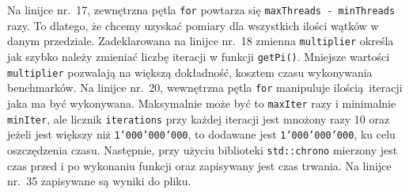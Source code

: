Na linijce nr.~17, zewnętrzna pętla \texttt{for} powtarza się \texttt{maxThreads - minThreads} razy. To dlatego, że chcemy uzyskać pomiary dla wszystkich ilości wątków w danym przedziale. Zadeklarowana na linijce nr.~18 zmienna \texttt{multiplier} określa jak szybko należy zmieniać liczbę iteracji w funkcji \texttt{getPi()}. Mniejsze wartości \texttt{multiplier} pozwalają na większą dokładność, kosztem czasu wykonywania benchmarków. Na linijce nr.~20, wewnętrzna pętla \texttt{for} manipuluje ilością iteracji jaka ma być wykonywana. Maksymalnie może być to \texttt{maxIter} razy i minimalnie \texttt{minIter}, ale licznik \texttt{iterations} przy każdej iteracji jest mnożony razy 10 oraz jeżeli jest większy niż \texttt{1'000'000'000}, to dodawane jest \texttt{1'000'000'000}, ku celu oszczędzenia czasu. Następnie, przy użyciu biblioteki \texttt{std::chrono} mierzony jest czas przed i po wykonaniu funkcji oraz zapisywany jest czas trwania. Na linijce nr.~35 zapisywane są wyniki do pliku. 
